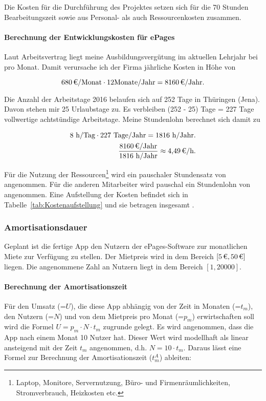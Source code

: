 Die Kosten für die Durchführung des Projektes setzen sich für die 70 Stunden Bearbeitungszeit sowie aus Personal- als auch Ressourcenkosten zusammen.

\paragraph{Berechnung der Entwicklungskosten für ePages}
Laut Arbeitsvertrag liegt meine Ausbildungsvergütung im aktuellen Lehrjahr bei  pro Monat. Damit verursache ich der Firma jährliche Kosten in Höhe von 

\begin{equation}
	\eur{680}/\mbox{Monat} \cdot 12 \mbox{Monate/Jahr} = \eur{8160}/\mbox{Jahr}.
\end{equation}

Die Anzahl der Arbeitstage 2016 belaufen sich auf 252 Tage in Thüringen (Jena). Davon stehen mir 25 Urlaubstage zu. Es verbleiben (252 - 25) Tage = 227 Tage vollwertige  achtstündige Arbeitstage. Meine Stundenlohn berechnet sich damit zu

\begin{eqnarray}
	8 \mbox{ h/Tag} \cdot 227 \mbox{ Tage/Jahr} = 1816 \mbox{ h/Jahr} .\\
	\frac{\eur{8160} \mbox{/Jahr}}{1816 \mbox{ h/Jahr}} \approx \eur{4,49}\mbox{/h}.
\end{eqnarray}

Für die Nutzung der Ressourcen\footnote{Laptop, Monitore, Servernutzung, Büro- und Firmenräumlichkeiten, Stromverbrauch, Heizkosten etc.} wird ein pauschaler Stundensatz von  angenommen. Für die anderen Mitarbeiter wird pauschal ein Stundenlohn von  angenommen. Eine Aufstellung der Kosten befindet sich in Tabelle~\ref{tab:Kostenaufstellung} und sie betragen insgesamt .

\subsubsection{Amortisationsdauer}
\label{sec:Amortisationsdauer}

Geplant ist die fertige App den Nutzern der ePages-Software zur monatlichen Miete zur Verfügung zu stellen. Der Mietpreis wird in dem Bereich $[\mbox{\eur{5}},\mbox{\eur{50}}]$ liegen. Die angenommene Zahl an Nutzern liegt in dem Bereich $[\mbox{1},\mbox{20000}]$.

\paragraph{Berechnung der Amortisationszeit}
Für den Umsatz (=$U$), die diese App abhängig von der Zeit in Monaten (=$t_m$), den Nutzern (=$N$) und von dem Mietpreis pro Monat (=$p_m$) erwirtschaften soll wird die Formel $U = p_m \cdot N \cdot t_m$ zugrunde gelegt. Es wird angenommen, dass die App nach einem Monat 10 Nutzer hat. Dieser Wert wird modellhaft als linear ansteigend mit der Zeit $t_m$ angenommen, d.h. $N = 10 \cdot t_m$. Daraus lässt eine Formel zur Berechnung der Amortisationszeit ($t^{A}_m$) ableiten:

